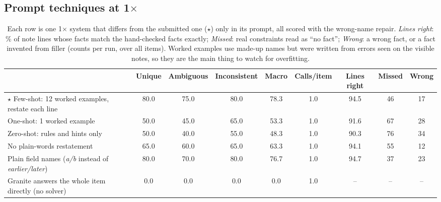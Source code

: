 \documentclass[10pt]{article}
\begin{document}
\subsection*{Prompt techniques at 1$\times$}
\begin{table}[H]
\centering\footnotesize\setlength{\tabcolsep}{3.5pt}\renewcommand{\arraystretch}{1.08}
\begin{tabular}{@{}p{5.4cm} ccc c c ccc@{}}
\toprule
 & Unique & Ambiguous & Inconsistent & \textbf{Macro} & Calls/item & Lines right & Missed & Wrong \\
\midrule
$\star$ Few-shot: 12 worked examples, restate each line & 80.0 & 75.0 & 80.0 & 78.3 & 1.0 & 94.5 & 46 & 17 \\
One-shot: 1 worked example & 50.0 & 45.0 & 65.0 & 53.3 & 1.0 & 91.6 & 67 & 28 \\
Zero-shot: rules and hints only & 50.0 & 40.0 & 55.0 & 48.3 & 1.0 & 90.3 & 76 & 34 \\
No plain-words restatement & 65.0 & 60.0 & 65.0 & 63.3 & 1.0 & 94.1 & 55 & 12 \\
Plain field names (\textit{a/b} instead of \textit{earlier/later}) & 80.0 & 70.0 & 80.0 & 76.7 & 1.0 & 94.7 & 37 & 23 \\
Granite answers the whole item directly (no solver) & 0.0 & 0.0 & 0.0 & 0.0 & 1.0 & -- & -- & -- \\
\bottomrule
\end{tabular}
\caption{Each row is one 1$\times$ system that differs from the submitted one ($\star$) only in its prompt, all scored with the wrong-name repair. \emph{Lines right}: \% of note lines whose facts match the hand-checked facts exactly; \emph{Missed}: real constraints read as ``no fact''; \emph{Wrong}: a wrong fact, or a fact invented from filler (counts per run, over all items). Worked examples use made-up names but were written from errors seen on the visible notes, so they are the main thing to watch for overfitting.}
\end{table}
\end{document}
